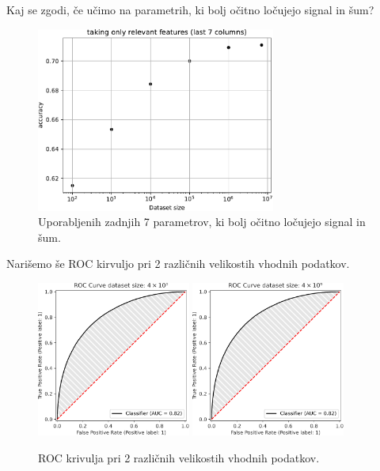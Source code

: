 Kaj se zgodi, če učimo na parametrih, ki bolj očitno ločujejo signal in šum?
\begin{figure}
    \centering
    \includegraphics[width=0.7\textwidth]{../pdf/catboost_mse_vs_size.pdf}
    \caption{Uporabljenih zadnjih 7 parametrov, ki bolj očitno ločujejo signal in šum.\label{fig:catboost-mse}}
\end{figure}
\newpage
Narišemo še ROC kirvuljo pri 2 različnih velikostih vhodnih podatkov.
\begin{figure}
    \centering
    \includegraphics[width=0.45\textwidth]{../pdf/roc_boost.pdf}
    \includegraphics[width=0.45\textwidth]{../pdf/roc_boost_bigdata.pdf}
    \caption{ROC krivulja pri 2 različnih velikostih vhodnih podatkov.\label{fig:catboost-roc}}
\end{figure}

